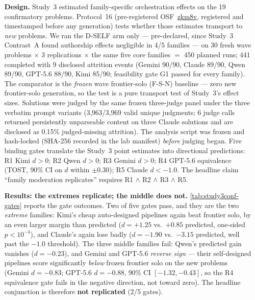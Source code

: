 \documentclass[12pt,a4paper]{article}
\begin{document}
\textbf{Design.} Study~3 estimated family-specific orchestration effects on
the 19 confirmatory problems. Protocol~16 (pre-registered
OSF~\href{https://osf.io/zkm8v}{zkm8v}, registered and timestamped before any
generation) tests whether those estimates transport to \emph{new} problems.
We ran the D-SELF arm only --- pre-declared, since Study~3 Contrast~A found
authorship effects negligible in 4/5 families --- on 30 fresh wave problems
$\times$ 3 replications $\times$ the same five core families $=$ 450 planned
runs; 441 completed with 9 disclosed attrition events (Gemini 90/90, Claude
89/90, Qwen 89/90, GPT-5.6 88/90, Kimi 85/90; feasibility gate G1 passed for
every family). The comparator is the \emph{frozen} wave frontier-solo (F-S-N)
baseline --- zero new frontier-solo generation, so the test is a pure
transport test of Study~3's effect sizes. Solutions were judged by the same
frozen three-judge panel under the three verbatim prompt variants
(3{,}963/3{,}969 valid unique judgments; 6 judge calls returned persistently
unparseable content on three Claude solutions and are disclosed as 0.15\%
judged-missing attrition). The analysis script was frozen and hash-locked
(SHA-256 recorded in the lab manifest) \emph{before} judging began. Five
binding gates translate the Study~3 point estimates into directional
predictions: R1 Kimi $d > 0$; R2 Qwen $d > 0$; R3 Gemini $d > 0$; R4 GPT-5.6
equivalence (TOST, 90\% CI on $d$ within $\pm 0.30$); R5 Claude $d < -1.0$.
The headline claim ``family moderation replicates'' requires
R1 $\wedge$ R2 $\wedge$ R3 $\wedge$ R5.

\textbf{Results: the extremes replicate; the middle does not.}
\cref{tab:study3conf-gates} reports the gate outcomes. Two of five gates
pass, and they are the two \emph{extreme} families: Kimi's cheap
auto-designed pipelines again beat frontier solo, by an even larger margin
than predicted ($d = +1.25$ vs.\ $+0.85$ predicted, one-sided
$p < 10^{-4}$), and Claude's again lose badly ($d = -1.90$ vs.\ $-3.15$
predicted, well past the $-1.0$ threshold). The three middle families fail:
Qwen's predicted gain vanishes ($d = -0.23$), and Gemini and GPT-5.6
\emph{reverse sign} --- their self-designed pipelines score significantly
\emph{below} frozen frontier solo on the new problems (Gemini $d = -0.83$;
GPT-5.6 $d = -0.88$, 90\% CI $[-1.32, -0.43]$, so the R4 equivalence gate
fails in the negative direction, not toward zero). The headline conjunction
is therefore \textbf{not replicated} (2/5 gates).
\end{document}
